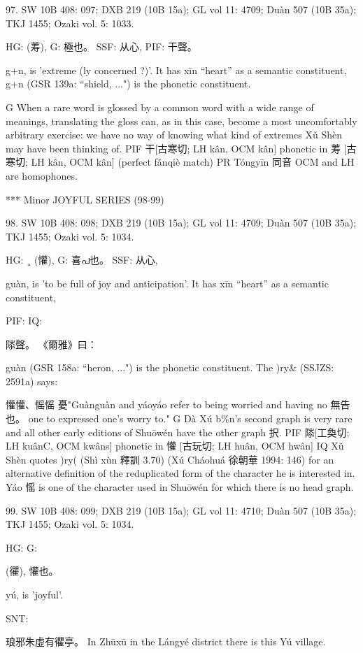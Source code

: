 97. SW 10B 408: 097; DXB 219 (10B 15a); GL vol 11: 4709; Duàn 507 (10B 35a); TKJ 1455; Ozaki vol. 5: 1033.


HG:   (䓓),
G:	極也。
SSF: 从心,
PIF: 干聲。

g+n,
is 'extreme (ly concerned ?)'.
It has xīn ``heart'' as a semantic constituent,
g+n (GSR 139a: ``shield, ...") is the phonetic constituent.

G      When a rare word is glossed by a common word with a wide range of meanings, translating the gloss can, as in this case, become a most uncomfortably arbitrary exercise: we have no way of knowing what kind of extremes Xǔ Shèn may have been thinking of.
PIF    干[古寒切; LH kân, OCM kân] phonetic in 䓓 [古寒切; LH kân, OCM kân] (perfect fǎnqiè
match)
PR	Tóngyīn 同音 OCM and LH are homophones.



***
Minor JOYFUL SERIES (98-99)

98. SW 10B 408: 098; DXB 219 (10B 15a); GL vol 11: 4709; Duàn 507 (10B 35a); TKJ 1455; Ozaki vol. 5: 1034.

HG:  ¸ (懽),
G:	喜പ也。
SSF: 从心,

guàn,
is 'to be full of joy and anticipation'.
It has xīn ``heart'' as a semantic constituent,

PIF: IQ:

䧙聲。
《爾雅》曰：

guàn (GSR 158a: ``heron, ...") is the phonetic constituent. The )ry& (SSJZS: 2591a) says:

懽懽、愮愮 憂"Guànguàn and yáoyáo refer to being worried and having no
無告也。	one to expressed one's worry to."
G	Dà Xú b\%n's second graph is very rare and all other early editions of Shuōwén have the other graph 択.
PIF     䧙[工奐切; LH kuânC, OCM kwâns] phonetic in 懽 [古玩切; LH huân, OCM hwân]
IQ	Xǔ Shèn quotes )ry( (Shì xùn 釋訓 3.70) (Xú Cháohuá 徐朝華 1994: 146) for an alternative definition of the reduplicated form of the character he is interested in.
Yáo 愮 is one of the character used in Shuōwén for which there is no head graph.


99. SW 10B 408: 099; DXB 219 (10B 15a); GL vol 11: 4710; Duàn 507 (10B 35a); TKJ 1455; Ozaki vol. 5: 1034.


HG:
G:

(忂),
懽也。

yú,
is 'joyful'.

SNT:

琅邪朱虛有忂亭。 In Zhūxū in the Lángyé district there is this Yú village.

